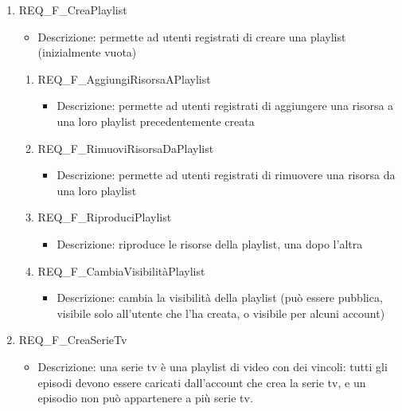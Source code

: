 \begin{enumerate}
	\item REQ\_F\_CreaPlaylist
		\begin{itemize}	
			\item Descrizione: permette ad utenti registrati di creare una playlist (inizialmente vuota)
		\end{itemize}
		\begin{enumerate}[label*=\arabic*.]
		\item REQ\_F\_AggiungiRisorsaAPlaylist
			\begin{itemize}	
				\item Descrizione: permette ad utenti registrati di aggiungere una risorsa a una loro playlist precedentemente creata
			\end{itemize}

		\item REQ\_F\_RimuoviRisorsaDaPlaylist
			\begin{itemize}	
				\item Descrizione: permette ad utenti registrati di rimuovere una risorsa da una loro playlist
			\end{itemize}

		\item REQ\_F\_RiproduciPlaylist
			\begin{itemize}	
				\item Descrizione: riproduce le risorse della playlist, una dopo l'altra
			\end{itemize}
		
		\item REQ\_F\_CambiaVisibilitàPlaylist
			\begin{itemize}	
				\item Descrizione: cambia la visibilità della playlist (può essere pubblica, visibile solo all'utente che l'ha creata, o visibile per alcuni account)
			\end{itemize}
		\end{enumerate}		
	
	\item REQ\_F\_CreaSerieTv
		\begin{itemize}	
			\item Descrizione: una serie tv è una playlist di video con dei vincoli: tutti gli episodi devono essere caricati dall'account che crea la serie tv, e un episodio non può appartenere a più serie tv.
		\end{itemize}


\end{enumerate}
